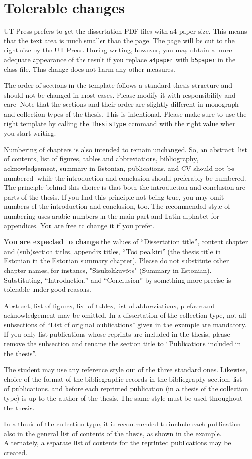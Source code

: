 \section{Tolerable changes}

UT Press prefers to get the dissertation PDF files with a4 paper size. This means that the text area is much smaller than the page. The page will be cut to the right size by the UT Press. During writing, however, you may obtain a more adequate appearance of the result if you replace \texttt{a4paper} with \texttt{b5paper} in the class file. This change does not harm any other measures.

The order of sections in the template follows a standard thesis structure and should not be changed in most cases. Please modify it with responsibility and care. Note that the sections and their order are slightly different in monograph and collection types of the thesis. This is intentional. Please make sure to use the right template by calling the \texttt{ThesisType} command with the right value when you start writing.

Numbering of chapters is also intended to remain unchanged. So, an abstract, list of contents, list of figures, tables and abbreviations, bibliography, acknowledgement, summary in Estonian, publications, and CV should not be numbered, while the introduction and conclusion should preferably be numbered. The principle behind this choice is that both the introduction and conclusion are parts of the thesis. If you find this principle not being true, you may omit numbers of the introduction and conclusion, too. The recommended style of numbering uses arabic numbers in the main part and Latin alphabet for appendices. You are free to change it if you prefer.

Y\textbf{ou are expected to change} the values of “Dissertation title”, content chapter and (sub)section titles, appendix titles, “Töö pealkiri” (the thesis title in Estonian in the Estonian summary chapter). Please do not substitute other chapter names, for instance, "Sisukokkuvõte" (Summary in Estonian). Substituting, “Introduction” and “Conclusion” by something more precise is tolerable under good reasons.

Abstract, list of figures, list of tables, list of abbreviations, preface and acknowledgement may be omitted. In a dissertation of the collection type, not all subsections of “List of original oublications” given in the example are mandatory. If you only list publications whose reprints are included in the thesis, please remove the subsection and rename the section title to “Publications included in the thesis”.

The student may use any reference style out of the three standard ones. Likewise, choice of the format of the bibliographic records in the bibliography section, list of publications, and before each reprinted publication (in a thesis of the collection type) is up to the author of the thesis. The same style must be used throughout the thesis.

In a thesis of the collection type, it is recommended to include each publication also in the general list of contents of the thesis, as shown in the example. Alternately, a separate list of contents for the reprinted publications may be created.